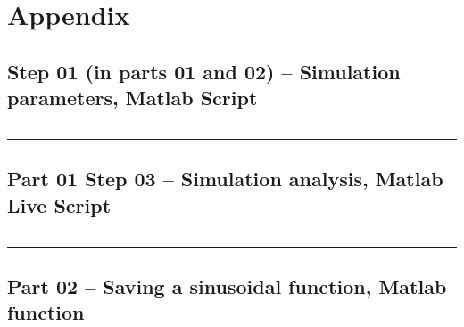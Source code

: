 \documentclass[12pt]{article}
\def\hr{{\par\noindent\rule{\textwidth}{0.4pt}}}
\begin{document}
\section{Appendix}

\subsection{Step 01 (in parts 01 and 02) -- Simulation parameters, Matlab Script}\label{sap:simulation params}
\inputminted{matlab}{step01_simulation_params.m}

\hr

\subsection{Part 01 Step 03 -- Simulation analysis, Matlab Live Script}\label{sap:simulation analysis mlx}
\inputminted{matlab}{step03_simulation_analysis_mlx.m}

\hr

\subsection{Part 02 -- Saving a sinusoidal function, Matlab function}\label{sap:save sinusoid}
\inputminted{matlab}{part02_save_sinusoid.m}
\end{document}
